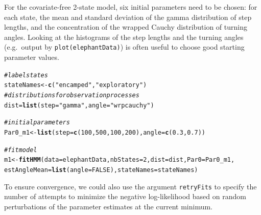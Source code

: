 \documentclass[12pt]{article}\usepackage[]{graphicx}\usepackage[]{xcolor}
\makeatletter
\newcommand{\hlnum}[1]{\textcolor[rgb]{0.686,0.059,0.569}{#1}}%
\newcommand{\hlsng}[1]{\textcolor[rgb]{0.192,0.494,0.8}{#1}}%
\newcommand{\hlcom}[1]{\textcolor[rgb]{0.678,0.584,0.686}{\textit{#1}}}%
\newcommand{\hldef}[1]{\textcolor[rgb]{0.345,0.345,0.345}{#1}}%
\newcommand{\hlkwb}[1]{\textcolor[rgb]{0.69,0.353,0.396}{#1}}%
\newcommand{\hlkwc}[1]{\textcolor[rgb]{0.333,0.667,0.333}{#1}}%
\newcommand{\hlkwd}[1]{\textcolor[rgb]{0.737,0.353,0.396}{\textbf{#1}}}%
\newenvironment{kframe}{%
 \def\at@end@of@kframe{}%
 \ifinner\ifhmode%
  \def\at@end@of@kframe{\end{minipage}}%
  \begin{minipage}{\columnwidth}%
 \fi\fi%
 \def\FrameCommand##1{\hskip\@totalleftmargin \hskip-\fboxsep
 \colorbox{shadecolor}{##1}\hskip-\fboxsep
     \hskip-\linewidth \hskip-\@totalleftmargin \hskip\columnwidth}%
 \MakeFramed {\advance\hsize-\width
   \@totalleftmargin\z@ \linewidth\hsize
   \@setminipage}}%
 {\par\unskip\endMakeFramed%
 \at@end@of@kframe}
\newenvironment{knitrout}{}{} %
\makeatother
\begin{document}
For the covariate-free 2-state model, six initial parameters need to be chosen: for each state, the mean and standard deviation of the gamma distribution of step lengths, and the concentration of the wrapped Cauchy distribution of turning angles. Looking at the histograms of the step lengths and the turning angles (e.g.\ output by \verb|plot(elephantData)|) is often useful to choose good starting parameter values.

\begin{knitrout}
\color{fgcolor}\begin{kframe}
\begin{alltt}
\hlcom{# label states}
\hldef{stateNames} \hlkwb{<-} \hlkwd{c}\hldef{(}\hlsng{"encamped"}\hldef{,}\hlsng{"exploratory"}\hldef{)}
\hlcom{# distributions for observation processes}
\hldef{dist} \hlkwb{=} \hlkwd{list}\hldef{(}\hlkwc{step} \hldef{=} \hlsng{"gamma"}\hldef{,} \hlkwc{angle} \hldef{=} \hlsng{"wrpcauchy"}\hldef{)}

\hlcom{# initial parameters}
\hldef{Par0_m1} \hlkwb{<-} \hlkwd{list}\hldef{(}\hlkwc{step}\hldef{=}\hlkwd{c}\hldef{(}\hlnum{100}\hldef{,}\hlnum{500}\hldef{,}\hlnum{100}\hldef{,}\hlnum{200}\hldef{),}\hlkwc{angle}\hldef{=}\hlkwd{c}\hldef{(}\hlnum{0.3}\hldef{,}\hlnum{0.7}\hldef{))}

\hlcom{# fit model}
\hldef{m1} \hlkwb{<-} \hlkwd{fitHMM}\hldef{(}\hlkwc{data} \hldef{= elephantData,} \hlkwc{nbStates} \hldef{=} \hlnum{2}\hldef{,} \hlkwc{dist} \hldef{= dist,} \hlkwc{Par0} \hldef{= Par0_m1,}
             \hlkwc{estAngleMean} \hldef{=} \hlkwd{list}\hldef{(}\hlkwc{angle}\hldef{=}\hlnum{FALSE}\hldef{),} \hlkwc{stateNames} \hldef{= stateNames)}
\end{alltt}
\end{kframe}
\end{knitrout}

To ensure convergence, we could also use the argument \verb|retryFits| to specify the number of attempts to minimize the negative log-likelihood based on random perturbations of the parameter estimates at the current minimum.\\
\end{document}
